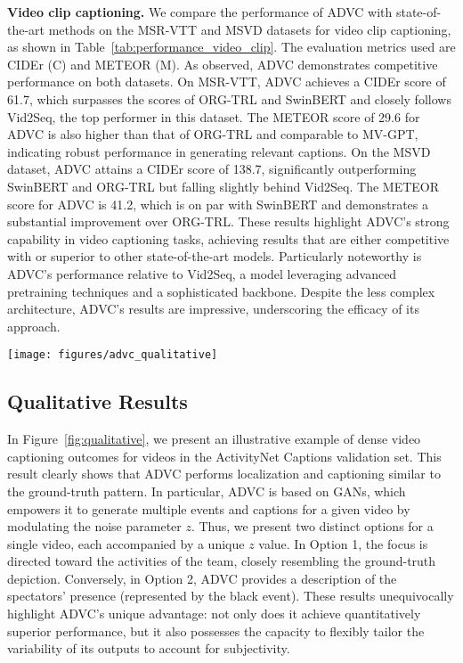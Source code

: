 \textbf{Video clip captioning.}
We compare the performance of ADVC with state-of-the-art methods on the MSR-VTT and MSVD datasets for video clip captioning, as shown in Table~\ref{tab:performance_video_clip}.
The evaluation metrics used are CIDEr (C) and METEOR (M).
As observed, ADVC demonstrates competitive performance on both datasets.
On MSR-VTT, ADVC achieves a CIDEr score of 61.7, which surpasses the scores of ORG-TRL and SwinBERT and closely follows Vid2Seq, the top performer in this dataset.
The METEOR score of 29.6 for ADVC is also higher than that of ORG-TRL and comparable to MV-GPT, indicating robust performance in generating relevant captions.
On the MSVD dataset, ADVC attains a CIDEr score of 138.7, significantly outperforming SwinBERT and ORG-TRL but falling slightly behind Vid2Seq.
The METEOR score for ADVC is 41.2, which is on par with SwinBERT and demonstrates a substantial improvement over ORG-TRL.
These results highlight ADVC's strong capability in video captioning tasks, achieving results that are either competitive with or superior to other state-of-the-art models.
Particularly noteworthy is ADVC's performance relative to Vid2Seq, a model leveraging advanced pretraining techniques and a sophisticated backbone.
Despite the less complex architecture, ADVC's results are impressive, underscoring the efficacy of its approach.

\begin{figure*}[t]
    \centering
    \texttt{[image: figures/advc\_qualitative]}
    \caption{Example of ADVC's dense video captioning on the ActivityNet Captions validation set.}
    \label{fig:qualitative}
\end{figure*}

\subsection{Qualitative Results}
In Figure~\ref{fig:qualitative}, we present an illustrative example of dense video captioning outcomes for videos in the ActivityNet Captions validation set.
This result clearly shows that ADVC performs localization and captioning similar to the ground-truth pattern.
In particular, ADVC is based on GANs, which empowers it to generate multiple events and captions for a given video by modulating the noise parameter $z$.
Thus, we present two distinct options for a single video, each accompanied by a unique $z$ value.
In Option 1, the focus is directed toward the activities of the team, closely resembling the ground-truth depiction. 
Conversely, in Option 2, ADVC provides a description of the spectators' presence (represented by the black event).
These results unequivocally highlight ADVC's unique advantage: not only does it achieve quantitatively superior performance, but it also possesses the capacity to flexibly tailor the variability of its outputs to account for subjectivity.

